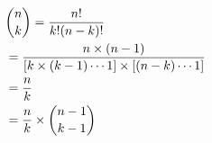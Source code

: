 \documentclass[preview]{standalone}
\begin{document}
\begin{align*}
& {n \choose k} = { {n!} \over {k! (n-k)!} } \\ &= { n \times (n-1) \over { [ k \times (k-1) \cdots 1] \times  [(n-k) \cdots 1] } } \\ &= { n \over k } \\ & = { n \over k } \times { {n-1} \choose {k-1} }
\end{align*}
\end{document}

